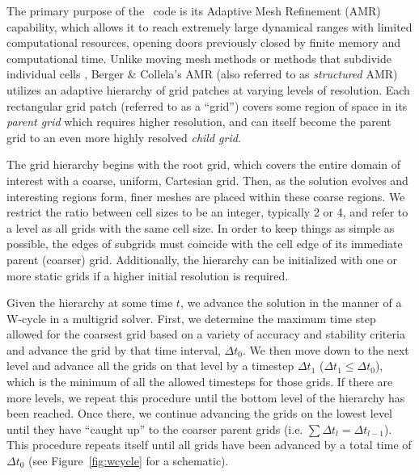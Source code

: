 The primary purpose of the \enzo\ code is its Adaptive Mesh Refinement
(AMR) capability, which allows it to reach extremely large dynamical
ranges with limited computational resources, opening doors previously
closed by finite memory and computational time. Unlike moving mesh
methods \citep{1995ApJS..100..269P,1995ApJS...97..231G} or methods
that subdivide individual cells \citep{Adjerid}, Berger \& Collela's
AMR (also referred to as \emph{structured} AMR) utilizes an adaptive
hierarchy of grid patches at varying levels of resolution.  Each
rectangular grid patch (referred to as a ``grid'') covers some region
of space in its \emph{parent grid} which requires higher resolution,
and can itself become the parent grid to an even more highly resolved
\emph{child grid}.

The grid hierarchy begins with the root grid, which covers the entire
domain of interest with a coarse, uniform, Cartesian grid. Then, as
the solution evolves and interesting regions form, finer meshes are
placed within these coarse regions.
We restrict the ratio between cell sizes to be an integer, typically 2
or 4, and refer to a level as all grids with the same cell size.  In
order to keep things as simple as possible, the edges of subgrids must
coincide with the cell edge of its immediate parent (coarser)
grid. Additionally, the hierarchy can be initialized with one or more
static grids if a higher initial resolution is required.

Given the hierarchy at some time $t$, we advance the solution in the
manner of a W-cycle in a multigrid solver.  First, we determine the
maximum time step allowed for the coarsest grid based on a variety of
accuracy and stability criteria and advance the grid by that time
interval, $\Delta t_0$.  We then move down to the next level and
advance all the grids on that level by a timestep $\Delta t_1$
($\Delta t_1 \leq \Delta t_0$), which is the minimum of all the
allowed timesteps for those grids.  If there are more levels, we
repeat this procedure until the bottom level of the hierarchy has been
reached.  Once there, we continue advancing the grids on the lowest
level until they have ``caught up'' to the coarser parent grids
(i.e. $\sum \Delta t_l = \Delta t_{l-1}$).  This procedure repeats
itself until all grids have been advanced by a total time of $\Delta
t_0$ (see Figure~\ref{fig:wcycle} for a schematic).


